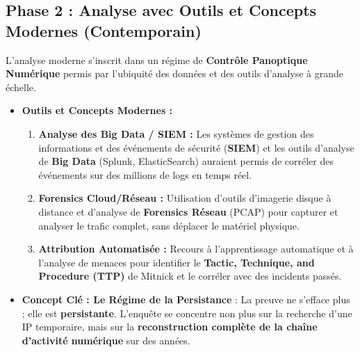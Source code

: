 \documentclass[a4paper,12pt]{report}
\begin{document}
	\subsection*{Phase 2 : Analyse avec Outils et Concepts Modernes (Contemporain)}
	L'analyse moderne s'inscrit dans un régime de \textbf{Contrôle Panoptique Numérique} permis par l'ubiquité des données et des outils d'analyse à grande échelle.
	\begin{itemize}
		\item \textbf{Outils et Concepts Modernes :}
		\begin{enumerate}
			\item \textbf{Analyse des Big Data / SIEM :} Les systèmes de gestion des informations et des événements de sécurité (\textbf{SIEM}) et les outils d'analyse de \textbf{Big Data} (Splunk, ElasticSearch) auraient permis de corréler des événements sur des millions de logs en temps réel.
			\item \textbf{Forensics Cloud/Réseau :} Utilisation d'outils d'imagerie disque à distance et d'analyse de \textbf{Forensics Réseau} (PCAP) pour capturer et analyser le trafic complet, sans déplacer le matériel physique.
			\item \textbf{Attribution Automatisée :} Recours à l'apprentissage automatique et à l'analyse de menaces pour identifier le \textbf{Tactic, Technique, and Procedure (TTP)} de Mitnick et le corréler avec des incidents passés.
		\end{enumerate}
		\item \textbf{Concept Clé : Le Régime de la Persistance} :
		La preuve ne s'efface plus ; elle est \textbf{persistante}. L'enquête se concentre non plus sur la recherche d'une IP temporaire, mais sur la \textbf{reconstruction complète de la chaîne d'activité numérique} sur des années.
	\end{itemize}
	
\end{document}
